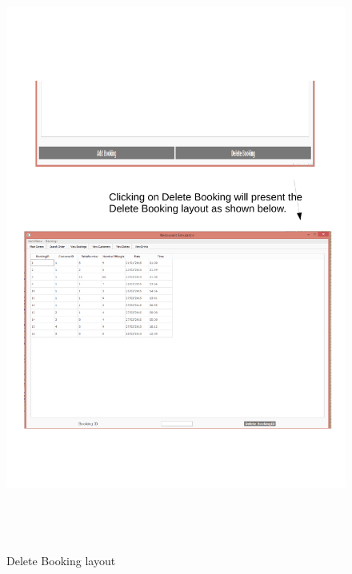 \begin{figure}[H]
    \includegraphics[height = 20cm]{./Testing/images/test3.pdf}
    \caption{Delete Booking layout} \label{fig:Test3}
\end{figure}


